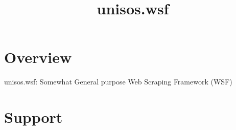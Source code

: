 \documentclass{article}
\begin{document}

\begin{comment}
*  [[elisp:(org-cycle)][| ]]  *DBLK: front-begin*                                       :: [[elisp:(beginning-of-buffer)][Top]] [[elisp:(delete-other-windows)][(1)]]  [[elisp:(org-cycle)][| ]]
\end{comment}


\begin{comment}
*  [[elisp:(org-cycle)][| ]]  *DBLK: copyright*                                       :: [[elisp:(beginning-of-buffer)][Top]] [[elisp:(delete-other-windows)][(1)]]  [[elisp:(org-cycle)][| ]]
\end{comment}


\begin{comment}
*  [[elisp:(org-cycle)][| ]]  *DBLK: front-end*                                       :: [[elisp:(beginning-of-buffer)][Top]] [[elisp:(delete-other-windows)][(1)]]  [[elisp:(org-cycle)][| ]]
\end{comment}


\begin{comment}
*  [[elisp:(org-cycle)][| ]]  *DBLK: main-begin*                                       :: [[elisp:(beginning-of-buffer)][Top]] [[elisp:(delete-other-windows)][(1)]]  [[elisp:(org-cycle)][| ]]
\end{comment}

\title{unisos.wsf}


\thispagestyle{empty}


\bigskip

\section{Overview}

unisos.wsf: Somewhat General purpose Web Scraping Framework (WSF)


\section{Support}
\end{document}
